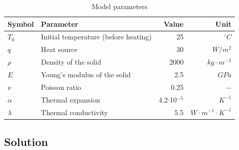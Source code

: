 \begin{table}[htbp]
\centering
\caption{Model parameters}
\label{tab63}
\begin{tabular}{llrr}
\toprule
Symbol & Parameter & Value & Unit \\
\midrule
$T_0$  & Initial temperature (before heating) & 25 & $^{\circ}C$ \\
$q$  & Heat source & 30 & $W/m^2$ \\
$\rho$  & Density of the solid &  2000 & $kg \cdot m^{-3}$  \\			
$E$ & Young's modulus of the solid & 2.5 & $GPa$ \\
$\nu$ & Poisson ratio & 0.25 & $-$ \\
$\alpha$ & Thermal expansion & 4.2$\cdot$10$^{-5}$ & $K^{-1}$ \\
$\lambda$ & Thermal conductivity & 5.5 & $W\cdot m^{-1}\cdot K^{-1}$ \\
\bottomrule
\end{tabular}
\end{table}


%

\subsection{Solution}
